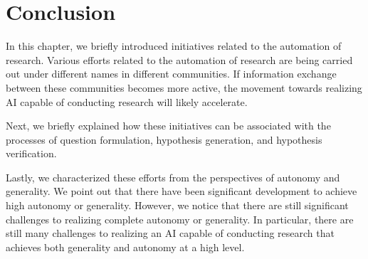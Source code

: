 \section{Conclusion}
In this chapter, we briefly introduced initiatives related to the automation of research. Various efforts related to the automation of research are being carried out under different names in different communities. If information exchange between these communities becomes more active, the movement towards realizing AI capable of conducting research will likely accelerate.

Next, we briefly explained how these initiatives can be associated with the processes of question formulation, hypothesis generation, and hypothesis verification.

Lastly, we characterized these efforts from the perspectives of autonomy and generality. We point out that there have been significant development to achieve high autonomy or generality. However, we notice that there are still significant challenges to realizing complete autonomy or generality. In particular, there are still many challenges to realizing an AI capable of conducting research that achieves both generality and autonomy at a high level.
